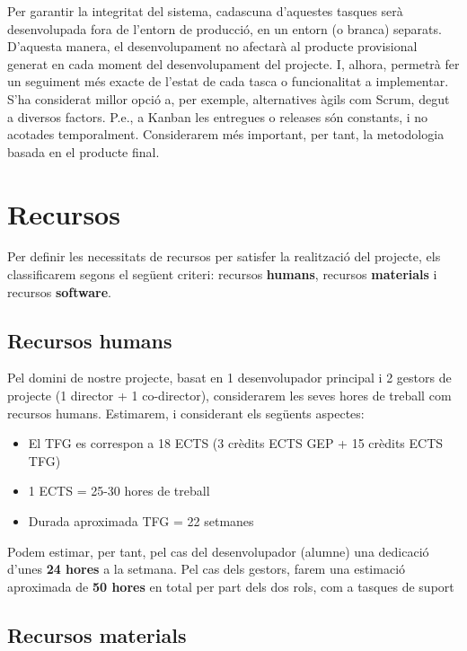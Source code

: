 Per garantir la integritat del sistema, cadascuna d’aquestes tasques serà desenvolupada fora de l’entorn de producció, en un entorn (o branca) separats. D’aquesta manera, el desenvolupament no afectarà al producte provisional generat en cada moment del desenvolupament del projecte. I, alhora, permetrà fer un seguiment més exacte de l’estat de cada tasca o funcionalitat a implementar. \\

S’ha considerat millor opció a, per exemple, alternatives àgils com Scrum, degut a diversos factors. P.e., a Kanban les entregues o releases són constants, i no acotades temporalment. Considerarem més important, per tant, la metodologia basada en el producte final. \\

\section{Recursos}

Per definir les necessitats de recursos per satisfer la realització del projecte, els classificarem segons el següent criteri: recursos \textbf{humans}, recursos \textbf{materials} i recursos \textbf{software}.

\subsection{Recursos humans}

Pel domini de nostre projecte, basat en 1 desenvolupador principal i 2 gestors de projecte (1 director + 1 co-director), considerarem les seves hores de treball com recursos humans. Estimarem, i considerant els següents aspectes:

\begin{itemize}
\item El TFG es correspon a 18 ECTS (3 crèdits ECTS GEP + 15 crèdits ECTS TFG)
\item 1 ECTS = 25-30 hores de treball
\item Durada aproximada TFG = 22 setmanes
\end{itemize}

Podem estimar, per tant, pel cas del desenvolupador (alumne) una dedicació d’unes \textbf{24 hores} a la setmana. Pel cas dels gestors, farem una estimació aproximada de \textbf{50 hores} en total per part dels dos rols, com a tasques de suport

\subsection{Recursos materials}

